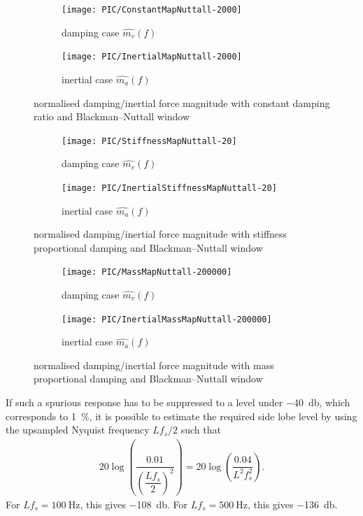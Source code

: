 \begin{figure}[htb!]
\centering
\begin{subfigure}{.48\textwidth}
\texttt{[image: PIC/ConstantMapNuttall-2000]}
\caption{damping case $\hat{m_v}\left(f\right)$}
\end{subfigure}
\begin{subfigure}{.48\textwidth}
\texttt{[image: PIC/InertialMapNuttall-2000]}
\caption{inertial case $\hat{m_a}\left(f\right)$}
\end{subfigure}
\caption{normalised damping/inertial force magnitude with constant damping ratio and Blackman--Nuttall window}\label{fig:map_constant_nuttall}
\end{figure}
\begin{figure}[htb!]
\centering
\begin{subfigure}{.48\textwidth}
\texttt{[image: PIC/StiffnessMapNuttall-20]}
\caption{damping case $\hat{m_v}\left(f\right)$}
\end{subfigure}
\begin{subfigure}{.48\textwidth}
\texttt{[image: PIC/InertialStiffnessMapNuttall-20]}
\caption{inertial case $\hat{m_a}\left(f\right)$}
\end{subfigure}
\caption{normalised damping/inertial force magnitude with stiffness proportional damping and Blackman--Nuttall window}\label{fig:map_stiffness_nuttall}
\end{figure}
\begin{figure}[htb!]
\centering
\begin{subfigure}{.48\textwidth}
\texttt{[image: PIC/MassMapNuttall-200000]}
\caption{damping case $\hat{m_v}\left(f\right)$}
\end{subfigure}
\begin{subfigure}{.48\textwidth}
\texttt{[image: PIC/InertialMassMapNuttall-200000]}
\caption{inertial case $\hat{m_a}\left(f\right)$}
\end{subfigure}
\caption{normalised damping/inertial force magnitude with mass proportional damping and Blackman--Nuttall window}\label{fig:map_mass_nuttall}
\end{figure}

If such a spurious response has to be suppressed to a level under \SI{-40}{\decibel}, which corresponds to \SI{1}{\percent}, it is possible to estimate the required side lobe level by using the upsampled Nyquist frequency $Lf_s/2$ such that
\begin{gather}
20\log\left(\dfrac{0.01}{\left(\dfrac{Lf_s}{2}\right)^2}\right)=20\log\left(\dfrac{0.04}{L^2f_s^2}\right).
\end{gather}
For $Lf_s=\SI{100}{\hertz}$, this gives \SI{-108}{\decibel}. For $Lf_s=\SI{500}{\hertz}$, this gives \SI{-136}{\decibel}.

